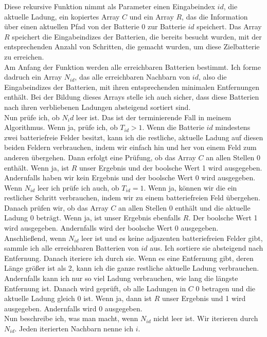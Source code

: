 \documentclass[a4paper,10pt,ngerman]{scrartcl}
\begin{document}
Diese rekursive Funktion nimmt als Parameter einen Eingabeindex $id$, die aktuelle Ladung, ein kopiertes Array $C$
und ein Array $R$, das die Information über einen aktuellen Pfad von der Batterie 0 zur Batterie $id$ speichert.
Das Array $R$ speichert die Eingabeindizes der Batterien, die bereits besucht wurden, mit der entsprechenden Anzahl von Schritten,
die gemacht wurden, um diese Zielbatterie zu erreichen.\\
Am Anfang der Funktion werden alle erreichbaren Batterien bestimmt. Ich forme dadruch ein Array $N_{id}$, das alle
erreichbaren Nachbarn von $id$, also die Eingabeindizes der Batterien, mit ihren entsprechenden minimalen Entfernungen enthält.
Bei der Bildung dieses Arrays stelle ich auch sicher, dass diese Batterien nach ihren verbliebenen Ladungen absteigend
sortiert sind.\\
Nun prüfe ich, ob $N_id$ leer ist. Das ist der terminierende Fall in meinem Algorithmus.
Wenn ja, prüfe ich, ob $T_{id} > 1$. Wenn die Batterie $id$ mindestens zwei batteriefreie Felder besitzt,
kann ich die restliche, aktuelle Ladung auf diesen beiden Feldern verbrauchen, indem wir einfach hin und her von einem 
Feld zum anderen übergehen. 
Dann erfolgt eine Prüfung, ob das Array $C$ an allen Stellen 0 enthält. Wenn ja, ist $R$ unser Ergebnis und der boolsche Wert 1 wird
ausgegeben. Andernfalls haben wir kein Ergebnis und der boolsche Wert 0 wird ausgegeben.\\
Wenn $N_{id}$ leer ich prüfe ich auch, ob $T_{id} = 1$. Wenn ja, können wir die ein restlicher Schritt verbrauchen, 
indem wir zu einem batteriefreien Feld übergehen. Danach prüfen wir, ob das Array $C$ an allen Stellen 0 enthält und die
aktuelle Ladung 0 beträgt. Wenn ja, ist unser Ergebnis ebenfalls $R$. Der boolsche Wert 1 wird ausgegeben. Andernfalls wird
der boolsche Wert 0 ausgegeben.\\
Anschließend, wenn $N_{id}$ leer ist und es keine adjazenten batteriefreien Felder gibt, sammle ich alle erreichbaren Batterien von $id$ aus.
Ich sortiere sie absteigend nach Entfernung. Danach iteriere ich durch sie. Wenn es eine Entfernung gibt, deren Länge größer ist als 2, kann ich 
die ganze restliche aktuelle Ladung verbrauchen. Andernfalls kann ich nur so viel Ladung verbrauchen, wie lang die längste Entfernung ist.
Danach wird geprüft, ob alle Ladungen in $C$ 0 betragen und die aktuelle Ladung gleich 0 ist. Wenn ja, dann ist $R$ unser Ergebnis und 1 wird ausgegeben. Andernfalls wird 0 ausgegeben.\\
Nun beschreibe ich, was man macht, wenn $N_{id}$ nicht leer ist. Wir iterieren durch $N_{id}$. Jeden iterierten Nachbarn nenne ich $i$.
\end{document}
